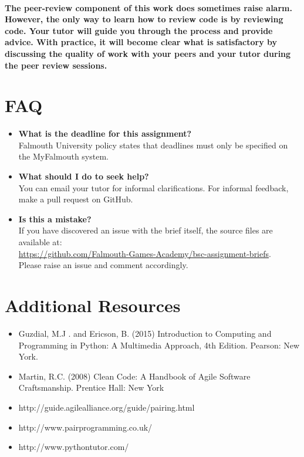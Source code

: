 \documentclass{../../fal_assignment}
\begin{document}
\paragraph{The peer-review component of this work does sometimes raise alarm. However, the only way to learn how to review code is by reviewing code. Your tutor will guide you through the process and provide advice. With practice, it will become clear what is satisfactory by discussing the quality of work with your peers and your tutor during the peer review sessions.} 

\section*{FAQ}

\begin{itemize}
	\item 	\textbf{What is the deadline for this assignment?} \\ 
    		Falmouth University policy states that deadlines must only be specified on the MyFalmouth system.
    		
	\item 	\textbf{What should I do to seek help?} \\ 
    		You can email your tutor for informal clarifications. For informal feedback, make a pull request on GitHub. 
    		
    	\item 	\textbf{Is this a mistake?} \\ 	
    		If you have discovered an issue with the brief itself, the source files are available at: \\
    		\url{https://github.com/Falmouth-Games-Academy/bsc-assignment-briefs}.\\
    		 Please raise an issue and comment accordingly.
\end{itemize}

\section*{Additional Resources}

\begin{itemize}
    \item Guzdial, M.J . and Ericson, B. (2015) Introduction to Computing and Programming in Python: A Multimedia Approach, 4th Edition. Pearson: New York.
    \item Martin, R.C. (2008) Clean Code: A Handbook of Agile Software Craftsmanship. Prentice Hall: New York
    \item http://guide.agilealliance.org/guide/pairing.html
    \item http://www.pairprogramming.co.uk/
    \item http://www.pythontutor.com/
\end{itemize}
\end{document}
